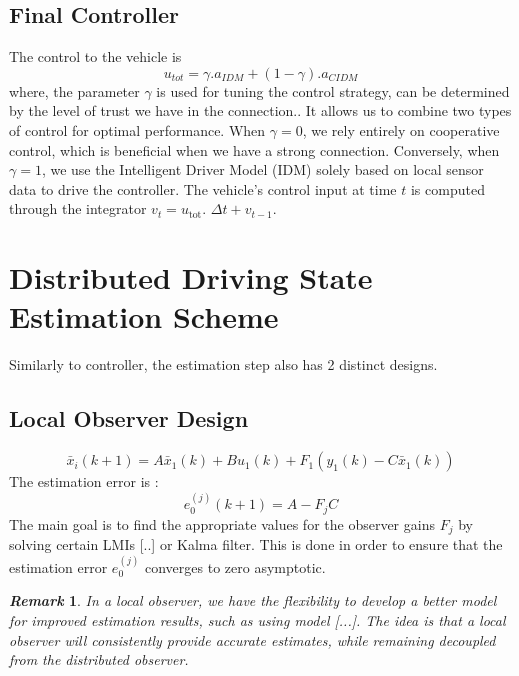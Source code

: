 \documentclass[letterpaper, 10pt, conference]{ieeeconf}  %
\newtheorem{remark}{\it Remark}%
\begin{document}
\subsection{Final Controller}
The control to the vehicle is 
\begin{equation}
    u_{tot} = \gamma. a_{IDM} + (1-\gamma).a_{CIDM} 
\end{equation}
where, the parameter $\gamma$ is used for tuning the control strategy, can be determined by the level of trust we have in the connection.. It allows us to combine two types of control for optimal performance. When $\gamma = 0$, we rely entirely on cooperative control, which is beneficial when we have a strong connection. Conversely, when $\gamma = 1$, we use the Intelligent Driver Model (IDM) solely based on local sensor data to drive the controller. The vehicle's control input at time $t$ is computed through the integrator $v_t= u _{\mathrm{tot}}$. $\Delta t + v_{t-1}$.


\section{Distributed Driving State Estimation Scheme}
Similarly to controller, the estimation step also has 2 distinct designs. 
\subsection{Local Observer Design}
\begin{equation}\label{observer_dis_plug}
\bar{x}_i(k+1)=A \bar{x}_1(k)+B u_1(k)+F_1(y_1(k)-C \bar{x}_1(k))
\end{equation}
The estimation error is : 
\begin{equation}
e_0^{(j)}(k+1)= A - F_j C
\end{equation}
The main goal is to find the appropriate values for the observer gains $F_j$ by solving certain LMIs [..] or Kalma filter. This is done in order to ensure that the estimation error $e_0^{(j)}$ converges to zero asymptotic. 

\begin{remark}
In a local observer, we have the flexibility to develop a better model for improved estimation results, such as using model [...]. The idea is that a local observer will consistently provide accurate estimates, while remaining decoupled from the distributed observer.
\end{remark}
\end{document}
